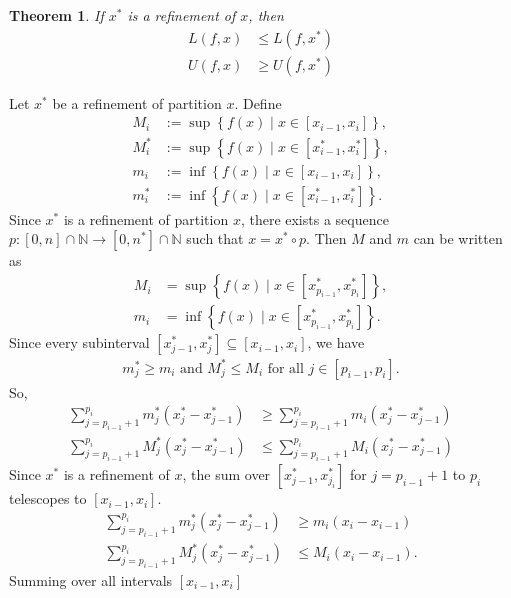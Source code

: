 \documentclass{amsart}
\numberwithin{equation}{section}
\let\oldendproof\endproof
\renewenvironment{proof}[1][\proofname]{%
  \setcounter{case}{0}
  \setcounter{step}{0}
  \oldproof[#1]%
}{\oldendproof}
\theoremstyle{plain}
\newtheorem{theorem}{Theorem}[section]
\theoremstyle{definition}
\theoremstyle{remark}
\begin{document}
\begin{theorem}
  If $x^*$ is a refinement of $x$, then
  \begin{align*}
    L(f,x) &\leq L(f,x^*)\\
    U(f,x) &\geq U(f,x^*)
  \end{align*}
\end{theorem}
\begin{proof}
  Let $x^*$ be a refinement of partition $x$.
  Define
  \begin{align*}
    M_i &:= \sup \left\{f(x) \mid x \in [x_{i-1}, x_i]\right\},\\
    M_i^* &:= \sup \left\{f(x) \mid x \in [x^*_{i-1}, x^*_i]\right\},\\
    m_i &:= \inf \left\{f(x) \mid x \in [x_{i-1}, x_i]\right\},\\
    m_i^* &:= \inf \left\{f(x) \mid x \in [x^*_{i-1}, x^*_i]\right\}.
  \end{align*}
  Since $x^*$ is a refinement of partition $x$, there exists a sequence $p:[0,n]\cap\mathbb{N} \to [0,n^*]\cap\mathbb{N}$ such that $x = x^* \circ p$.
  Then $M$ and $m$ can be written as
  \begin{align*}
    M_i &= \sup \left\{ f(x) \mid x \in \left[x^*_{p_{i-1}}, x^*_{p_i}\right] \right\},\\
    m_i &= \inf \left\{ f(x) \mid x \in \left[x^*_{p_{i-1}}, x^*_{p_i}\right]\right\}.
  \end{align*}
  Since every subinterval $[x_{j-1}^*, x_j^*] \subseteq [x_{i-1}, x_i]$, we have
  \begin{align*}
    m_j^* \geq m_i \text{ and } M_j^* \leq M_i \text{ for all } j \in[p_{i-1}, p_i].
  \end{align*}
  So,
  \begin{align*}
    \sum_{j=p_{i-1}+1}^{p_i} m_j^* (x_j^* - x_{j-1}^*) &\geq \sum_{j=p_{i-1}+1}^{p_i}  m_i (x_j^* - x_{j-1}^*)\\
    \sum_{j=p_{i-1}+1}^{p_i} M_j^* (x_j^* - x_{j-1}^*) &\leq \sum_{j=p_{i-1}+1}^{p_i} M_i (x_j^* - x_{j-1}^*)
  \end{align*}
  Since $x^*$ is a refinement of $x$, the sum over $[x_{j-1}^*,x_{j_i}^*]$ for $j=p_{i-1}+1$ to $p_i$ telescopes to $[x_{i-1}, x_i]$.
  \begin{align*}
    \sum_{j=p_{i-1}+1}^{p_i} m_j^* (x_j^* - x_{j-1}^*) &\geq m_i (x_i - x_{i-1})\\
    \sum_{j=p_{i-1}+1}^{p_i} M_j^* (x_j^* - x_{j-1}^*) &\leq M_i (x_i - x_{i-1}).
  \end{align*}
  Summing over all intervals $[x_{i-1}, x_i]$

\end{proof}
\end{document}

